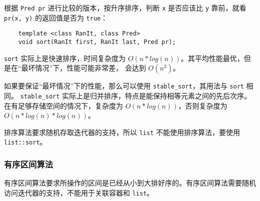 \documentclass[UTF8]{ctexart}
\begin{document}
根据 \texttt{Pred pr} 进行比较的版本，按升序排序，判断 \texttt{x} 是否应该比 \texttt{y} 靠前，就看
\texttt{pr(x, y)} 的返回值是否为 \texttt{true}：
\begin{verbatim}
    template <class RanIt, class Pred>
    void sort(RanIt first, RanIt last, Pred pr);
\end{verbatim}

\texttt{sort} 实际上是快速排序，时间复杂度为 $O(n*log(n))$。其平均性能最优，但是在“最坏情况”下，性能可能非常差，
会达到 $O(n^2)$。

如果要保证“最坏情况”下的性能，那么可以使用 \texttt{stable\_sort}，其用法与 \texttt{sort} 相同。
\texttt{stable\_sort} 实际上是归并排序，特点是能保持相等元素之间的先后次序。在有足够存储空间的情况下，复杂度为
$O(n*log(n))$，否则复杂度为 $O(n*log(n)*log(n))$。

排序算法要求随机存取迭代器的支持，所以 \texttt{list} 不能使用排序算法，要使用 \texttt{list::sort}。

\subsubsection{有序区间算法}
有序区间算法要求所操作的区间是已经从小到大排好序的。有序区间算法需要随机访问迭代器的支持，不能用于关联容器和
\texttt{list}。
\end{document}
